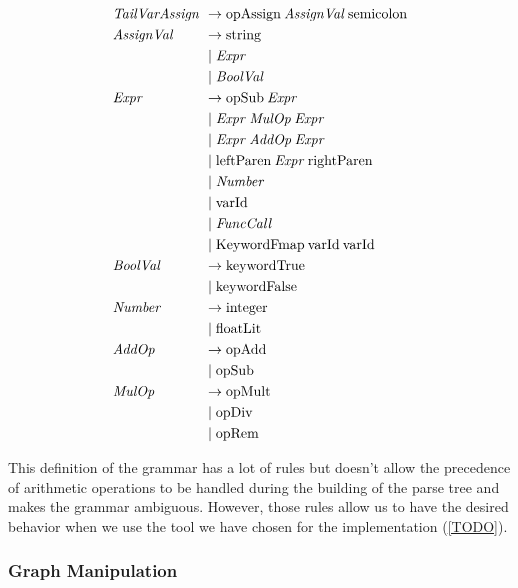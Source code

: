 \begin{align*}
    \omit $\mathit{TailVarAssign}$ \hfil & \rightarrow \text{opAssign} \: \mathit{AssignVal} \: \text{semicolon} \\
    \omit $\mathit{AssignVal}$ \hfil & \rightarrow \text{string} \\
    & \mid \mathit{Expr} \\
    & \mid \mathit{BoolVal}\\
    \omit $\mathit{Expr}$ \hfil & \rightarrow \text{opSub} \: \mathit{Expr} \\
    & \mid \mathit{Expr} \: \mathit{MulOp} \: \mathit{Expr} \\
    & \mid \mathit{Expr} \: \mathit{AddOp} \: \mathit{Expr} \\
    & \mid \text{leftParen}\: \mathit{Expr} \: \text{rightParen} \\
    & \mid \mathit{Number} \\
    & \mid \text{varId} \\
    & \mid \mathit{FuncCall} \\
    & \mid \text{KeywordFmap} \: \text{varId} \: \text{varId} \\
    \omit $\mathit{BoolVal}$ \hfil & \rightarrow \text{keywordTrue} \\
    & \mid \text{keywordFalse} \\
    \omit $\mathit{Number}$ \hfil & \rightarrow \text{integer} \\
    & \mid \text{floatLit} \\
    \omit $\mathit{AddOp}$ \hfil & \rightarrow \text{opAdd} \\
    & \mid \text{opSub} \\
    \omit $\mathit{MulOp}$ \hfil & \rightarrow \text{opMult} \\
    & \mid \text{opDiv} \\
    & \mid \text{opRem}
\end{align*}

This definition of the grammar has a lot of rules but doesn't allow the precedence of arithmetic operations to be handled during the building of the parse tree and makes the grammar ambiguous.
However, those rules allow us to have the desired behavior when we use the tool we have chosen for the implementation (\ref{TODO}).

\subsubsection*{Graph Manipulation}

